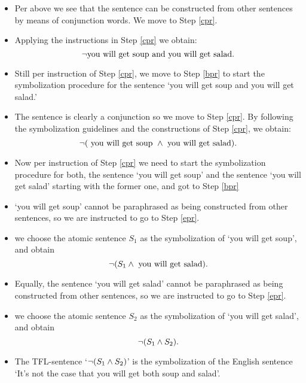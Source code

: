 \begin{itemize}
\item Per above we see that the sentence can be constructed from other sentences by means of conjunction words. We move to Step \ref{cpr}.
\item Applying the instructions in Step \ref{cpr} we obtain:
$$\neg\text{you will get soup and you will get salad}.$$
\item Still per instruction of Step \ref{cpr}, we move to Step \ref{bpr} to start the symbolization procedure for the sentence  `you will get soup and you will get salad.'
\item The sentence is clearly a conjunction so we move to Step \ref{cpr}. By following the symbolization guidelines and the constructions of Step \ref{cpr}, we obtain:
$$\neg(\text{ you will get soup }\mathbin{\wedge}\text{ you will get salad}).$$
\item Now per instruction of Step \ref{cpr} we need to start the symbolization procedure for both, the sentence `you will get soup' and the sentence `you will get salad' starting with the former one, and got to Step \ref{bpr}
\item `you will get soup' cannot be paraphrased as being constructed from other sentences, so we are instructed to go to Step \ref{epr}.
\item we choose the atomic sentence $S_1$ as the symbolization of `you will get soup', and obtain
$$\neg(S_1\mathbin{\wedge}\text{ you will get salad}).$$
\item Equally, the sentence `you will get salad' cannot be paraphrased as being constructed from other sentences, so we are instructed to go to Step \ref{epr}.
\item we choose the atomic sentence $S_2$ as the symbolization of `you will get salad', and obtain
$$\neg(S_1\mathbin{\wedge} S_2).$$
\item The TFL-sentence `$\neg(S_1\mathbin{\wedge} S_2)$' is the symbolization of the English sentence `It's not the case that you will get both soup and salad'.
\end{itemize}

